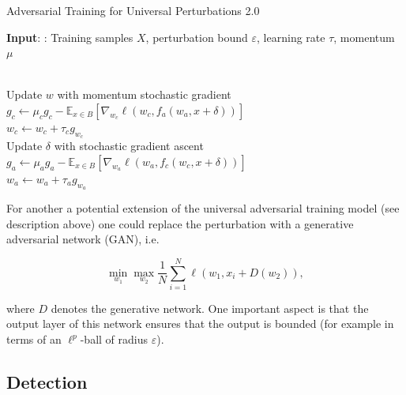 \documentclass[12pt]{article}
\begin{document}
\begin{algorithm}
\caption{Adversarial Training for Universal Perturbations 2.0}\label{Alg_4}

 \textbf{Input}: : Training samples $X$, perturbation bound $\varepsilon$, learning rate $\tau$, momentum $\mu$ \\
\begin{algorithmic}[1]




 \\
\hspace{\algorithmicindent} Update $w$ with momentum stochastic gradient \\
\hspace{\algorithmicindent} \hspace{\algorithmicindent} $g_c \gets \mu_c g_c - \mathbb{E}_{x \in B} [\nabla_{w_c} \ell(w_c,f_a(w_a,x+\delta))]$ \\
\hspace{\algorithmicindent} \hspace{\algorithmicindent} $w_c \gets w_c + \tau_c g_{w_c}$ \\
\hspace{\algorithmicindent} Update $\delta$ with stochastic gradient ascent \\
\hspace{\algorithmicindent} \hspace{\algorithmicindent}  $g_a \gets \mu_a g_a - \mathbb{E}_{x \in B} [\nabla_{w_a} \ell(w_a,f_c(w_c,x+\delta))]$ \\
\hspace{\algorithmicindent} \hspace{\algorithmicindent} $w_a \gets w_a + \tau_a g_{w_a}$
\EndFor
\EndFor
\end{algorithmic}
\end{algorithm}

For another a potential extension of the universal adversarial training model (see description above) one could replace the perturbation with a generative adversarial network (GAN), i.e.

$$ \min_{w_1} \max_{w_2} \frac1N \sum_{i = 1}^N \ell(w_1, x_i + D(w_2)) ,$$

where $D$ denotes the generative network. One important aspect is that the output layer of this network ensures that the output is bounded (for example in terms of an $\ell^p$-ball of radius $\varepsilon$). 

\subsection{Detection}




\end{document}
